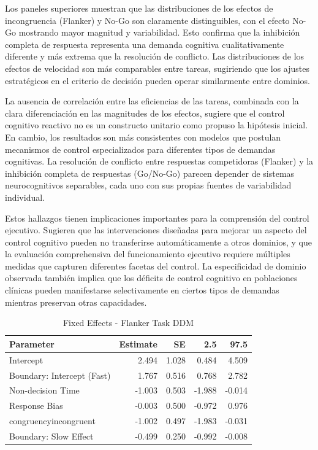 \documentclass[
  spanish,
  10pt,
]{article}
\begin{document}
Los paneles superiores muestran que las distribuciones de los efectos de
incongruencia (Flanker) y No-Go son claramente distinguibles, con el
efecto No-Go mostrando mayor magnitud y variabilidad. Esto confirma que
la inhibición completa de respuesta representa una demanda cognitiva
cualitativamente diferente y más extrema que la resolución de conflicto.
Las distribuciones de los efectos de velocidad son más comparables entre
tareas, sugiriendo que los ajustes estratégicos en el criterio de
decisión pueden operar similarmente entre dominios.

La ausencia de correlación entre las eficiencias de las tareas,
combinada con la clara diferenciación en las magnitudes de los efectos,
sugiere que el control cognitivo reactivo no es un constructo unitario
como propuso la hipótesis inicial. En cambio, los resultados son más
consistentes con modelos que postulan mecanismos de control
especializados para diferentes tipos de demandas cognitivas. La
resolución de conflicto entre respuestas competidoras (Flanker) y la
inhibición completa de respuestas (Go/No-Go) parecen depender de
sistemas neurocognitivos separables, cada uno con sus propias fuentes de
variabilidad individual.

Estos hallazgos tienen implicaciones importantes para la comprensión del
control ejecutivo. Sugieren que las intervenciones diseñadas para
mejorar un aspecto del control cognitivo pueden no transferirse
automáticamente a otros dominios, y que la evaluación comprehensiva del
funcionamiento ejecutivo requiere múltiples medidas que capturen
diferentes facetas del control. La especificidad de dominio observada
también implica que los déficits de control cognitivo en poblaciones
clínicas pueden manifestarse selectivamente en ciertos tipos de demandas
mientras preservan otras capacidades.

\begin{table}[H]
\centering
\caption{\label{tab:unnamed-chunk-2}Fixed Effects - Flanker Task DDM}
\centering
\begin{tabular}[t]{lrrrr}
\toprule
Parameter & Estimate & SE & 2.5 & 97.5\\
\midrule
Intercept & 2.494 & 1.028 & 0.484 & 4.509\\
Boundary: Intercept (Fast) & 1.767 & 0.516 & 0.768 & 2.782\\
Non-decision Time & -1.003 & 0.503 & -1.988 & -0.014\\
Response Bias & -0.003 & 0.500 & -0.972 & 0.976\\
congruencyincongruent & -1.002 & 0.497 & -1.983 & -0.031\\
\addlinespace
Boundary: Slow Effect & -0.499 & 0.250 & -0.992 & -0.008\\
\bottomrule
\end{tabular}
\end{table}
\end{document}
